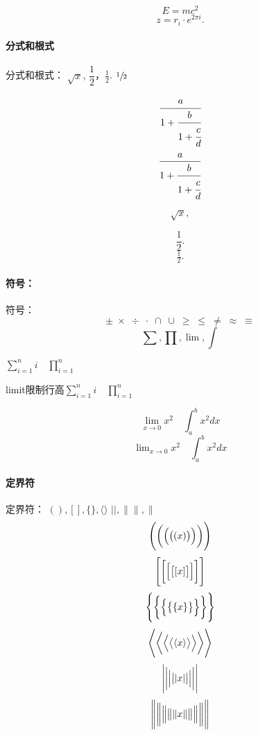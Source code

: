 \documentclass{article}
\begin{document}
\begin{equation}  %
E=mc^2
\end{equation}
\[ z = r_i\cdot e^{2\pi i}. \]  %

\paragraph{分式和根式}分式和根式：
$\sqrt{x}$, $\dfrac{1}{2}$，$\frac{1}{2}$. %
$\sfrac{1}{2}$   %

\[ \cfrac{a}{1+\cfrac{b}{1+\cfrac{c}{d}}} \]   %
\[ \frac{a}{1+\cfrac{b}{1+\cfrac{c}{d}}} \]

\[ \sqrt{x}, \]    %

\[ \frac{1}{2}. \]
\[ \tfrac{1}{2}. \]    %

\paragraph{符号：}符号：
\[ \pm\; \times \; \div\; \cdot\; \cap\; \cup\;
\geq\; \leq\; \neq\; \approx \; \equiv \]
\[ \sum, \prod, \lim, \int \]

$ \sum_{i=1}^n i\quad \prod_{i=1}^n $  %


limit限制行高$ \sum\limits _{i=1}^n i\quad \prod\limits _{i=1}^n $

\[ \lim_{x\to0}x^2 \quad \int_a^b x^2 dx \]  %
\[ \lim\nolimits _{x\to0}x^2\quad \int\nolimits_a^b x^2 dx \]

\paragraph{定界符}定界符：
$(), [], \{\}, \langle\rangle $
$ \lvert\rvert, \lVert\rVert, \|$
\[ \Biggl(\biggl(\Bigl(\bigl((x)\bigr)\Bigr)\biggr)\Biggr) \]
\[ \Biggl[\biggl[\Bigl[\bigl[[x]\bigr]\Bigr]\biggr]\Biggr] \]
\[ \Biggl \{\biggl \{\Bigl \{\bigl \{\{x\}\bigr \}\Bigr \}\biggr \}\Biggr\} \]
\[ \Biggl\langle\biggl\langle\Bigl\langle\bigl\langle\langle x
\rangle\bigr\rangle\Bigr\rangle\biggr\rangle\Biggr\rangle \]
\[ \Biggl\lvert\biggl\lvert\Bigl\lvert\bigl\lvert\lvert x
\rvert\bigr\rvert\Bigr\rvert\biggr\rvert\Biggr\rvert \]
\[ \Biggl\lVert\biggl\lVert\Bigl\lVert\bigl\lVert\lVert x
\rVert\bigr\rVert\Bigr\rVert\biggr\rVert\Biggr\rVert \]
\end{document}
